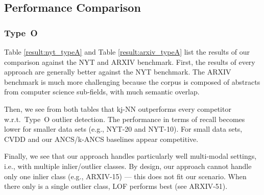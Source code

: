 \subsection{Performance Comparison}

\subsubsection{Type~O}
Table \ref{result:nyt_typeA} and Table \ref{result:arxiv_typeA} list the results of our comparison against the NYT and ARXIV benchmark. First, the results of every approach are generally better against the NYT benchmark. The ARXIV benchmark is much more challenging because the corpus is composed of abstracts from computer science sub-fields, with much semantic overlap.

Then, we see from both tables that \gls{kj-NN} outperforms every competitor w.r.t.\ Type~O outlier detection. The performance in terms of recall becomes lower for smaller data sets (e.g., NYT-20 and NYT-10). For small data sets,  \gls{CVDD} and our \gls{ANCS}/\gls{k-ANCS} baselines appear competitive.  

Finally, we see that our approach handles particularly well multi-modal settings, i.e., with multiple inlier/outlier classes. 
By design, our approach cannot handle only one inlier class (e.g., ARXIV-15) --- this does not fit our scenario. When there only is a single outlier class, \gls{LOF} performs best (see ARXIV-51).

